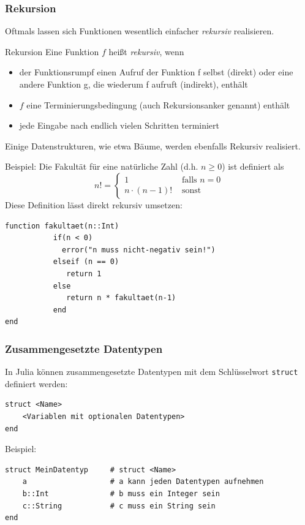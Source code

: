 \begin{frame}
\frametitle{Rekursion}
Oftmals lassen sich Funktionen wesentlich einfacher \textit{rekursiv} realisieren.
\begin{block}{Rekursion}
Eine Funktion $f$ heißt \textit{rekursiv}, wenn
\begin{itemize}[<+->]
\item der Funktionsrumpf einen Aufruf der Funktion f selbst (direkt) oder eine andere Funktion g, die wiederum f aufruft (indirekt), enthält
\item $f$ eine Terminierungsbedingung (auch Rekursionsanker genannt) enthält
\item jede Eingabe nach endlich vielen Schritten terminiert
\end{itemize}
\end{block}
Einige Datenstrukturen, wie etwa Bäume, werden ebenfalls Rekursiv realisiert.
\end{frame}
\begin{frame}[fragile]
Beispiel:
Die Fakultät für eine natürliche Zahl (d.h. $n\geq 0$) ist definiert als
\[ n! = \begin{cases} 1 & \text{ falls } n = 0 \\ n\cdot (n-1)! & \text{ sonst } \end{cases} \]
Diese Definition lässt direkt rekursiv umsetzen:
\begin{verbatim}
function fakultaet(n::Int)
           if(n < 0)
             error("n muss nicht-negativ sein!")
           elseif (n == 0)
              return 1
           else
              return n * fakultaet(n-1)
           end
end
\end{verbatim}
\end{frame}
\begin{frame}[fragile]
\frametitle{Zusammengesetzte Datentypen}
In Julia können zusammengesetzte Datentypen mit dem Schlüsselwort \verb+struct+ definiert werden:
\begin{verbatim}
struct <Name>
    <Variablen mit optionalen Datentypen>              
end
\end{verbatim}\pause
Beispiel:
\begin{verbatim}
struct MeinDatentyp     # struct <Name>
    a                   # a kann jeden Datentypen aufnehmen
    b::Int              # b muss ein Integer sein
    c::String           # c muss ein String sein
end
\end{verbatim}
\end{frame}
